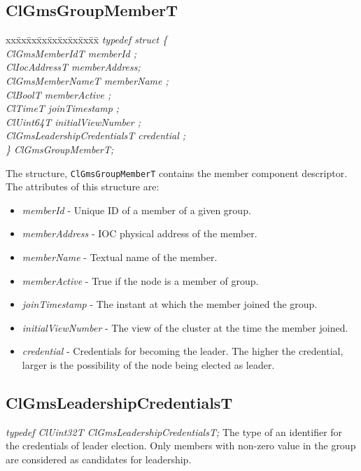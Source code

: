 \begin{flushleft}
\subsection{ClGmsGroupMemberT}
\begin{tabbing}
xx\=xx\=xx\=xx\=xx\=xx\=xx\=xx\=xx\=\kill
\textit{typedef struct \{}\\
\>\>\>\>\textit{ClGmsMemberIdT              memberId ;}\\
\>\>\>\>\textit{ClIocAddressT               memberAddress;}\\
\>\>\>\>\textit{ClGmsMemberNameT            memberName ;}\\
\>\>\>\>\textit{ClBoolT                     memberActive ;}\\
\>\>\>\>\textit{ClTimeT                     joinTimestamp ;}\\
\>\>\>\>\textit{ClUint64T                   initialViewNumber ;}\\
\>\>\>\>\textit{ClGmsLeadershipCredentialsT credential ;}\\
\textit{\} ClGmsGroupMemberT;}\end{tabbing}
The structure, {\tt{ClGmsGroupMemberT}} contains the member component descriptor. The attributes of this structure are:
\begin{itemize}
\item
\textit{memberId} - Unique ID of a member of a given group.
\item
\textit{memberAddress} - IOC physical address of the member.
\item
\textit{memberName} - Textual name of the member.
\item
\textit{memberActive} - True if the node is a member of group.
\item
\textit{joinTimestamp} - The instant at which the member joined the group.
\item
\textit{initialViewNumber} - The view of the cluster at the time the member joined.
\item
\textit{credential} - Credentials for becoming the leader. The higher the credential,
 larger is the possibility of the node being elected as leader.
\end{itemize}




\subsection{ClGmsLeadershipCredentialsT}
\textit{typedef ClUint32T   ClGmsLeadershipCredentialsT;}
\newline
\newline
The type of an identifier for the credentials of leader election. Only members with non-zero value
 in the group are considered as candidates for leadership.



\end{flushleft}
